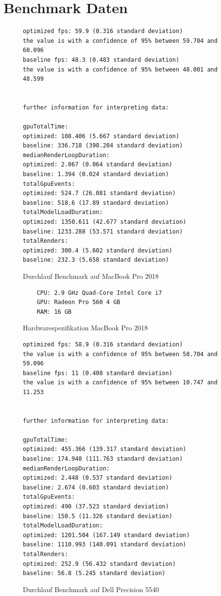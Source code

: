 \section{Benchmark Daten}
\begin{figure}[H]
  \begin{lstlisting}
optimized fps: 59.9 (0.316 standard deviation)
the value is with a confidence of 95% between 59.704 and 60.096
baseline fps: 48.3 (0.483 standard deviation)
the value is with a confidence of 95% between 48.001 and 48.599


further information for interpreting data:

gpuTotalTime:
optimized: 108.406 (5.667 standard deviation)
baseline: 336.718 (398.204 standard deviation)
medianRenderLoopDuration:
optimized: 2.067 (0.064 standard deviation)
baseline: 1.394 (0.024 standard deviation)
totalGpuEvents:
optimized: 524.7 (26.081 standard deviation)
baseline: 518.6 (17.89 standard deviation)
totalModelLoadDuration:
optimized: 1350.611 (42.677 standard deviation)
baseline: 1233.288 (53.571 standard deviation)
totalRenders:
optimized: 300.4 (5.602 standard deviation)
baseline: 232.3 (5.658 standard deviation)
  \end{lstlisting}
\caption{Durchlauf Benchmark auf MacBook Pro 2018}
\label{fig:marcbookBenchmarkRun}
\end{figure}

\begin{figure}[H]
  \begin{lstlisting}
    CPU: 2.9 GHz Quad-Core Intel Core i7
    GPU: Radeon Pro 560 4 GB
    RAM: 16 GB
  \end{lstlisting}
\caption{Hardwarespezifikation MacBook Pro 2018}
\label{fig:marcbookProSpecification}
\end{figure}

\begin{figure}[H]
  \begin{lstlisting}
optimized fps: 58.9 (0.316 standard deviation)
the value is with a confidence of 95% between 58.704 and 59.096
baseline fps: 11 (0.408 standard deviation)
the value is with a confidence of 95% between 10.747 and 11.253


further information for interpreting data:

gpuTotalTime:
optimized: 455.366 (139.317 standard deviation)
baseline: 174.948 (111.763 standard deviation)
medianRenderLoopDuration:
optimized: 2.448 (0.537 standard deviation)
baseline: 2.674 (0.603 standard deviation)
totalGpuEvents:
optimized: 490 (37.523 standard deviation)
baseline: 150.5 (11.326 standard deviation)
totalModelLoadDuration:
optimized: 1201.504 (167.149 standard deviation)
baseline: 1110.993 (140.091 standard deviation)
totalRenders:
optimized: 252.9 (56.432 standard deviation)
baseline: 56.8 (5.245 standard deviation)
  \end{lstlisting}
\caption{Durchlauf Benchmark auf Dell Precision 5540}
\label{fig:windowsBenchmarkRun}
\end{figure}

